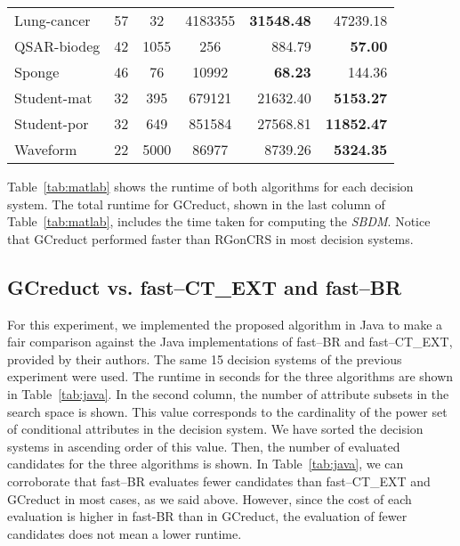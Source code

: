 \documentclass[letterpaper, twoside, openright, 12pt]{book}%
\begin{document}
\begin{table}[H]
\begin{tabular}{lcccrr}
			Lung-cancer               & 57         & 32        & 4183355  & \textbf{31548.48} & 47239.18           \\
			QSAR-biodeg               & 42         & 1055      & 256      &  884.79           & \textbf{57.00}     \\
			Sponge                    & 46         & 76        & 10992    & \textbf{68.23}    & 144.36             \\
			Student-mat               & 32         & 395       & 679121   & 21632.40          & \textbf{5153.27}   \\
			Student-por               & 32         & 649       & 851584   & 27568.81          & \textbf{11852.47}  \\
			Waveform                  & 22         & 5000      & 86977    & 8739.26           & \textbf{5324.35}   \\				
			\hline
    	\end{tabular}
	 \end{table}
	    
	 Table~\ref{tab:matlab} shows the runtime of both algorithms for each decision system. The total runtime for GCreduct, shown in the last column of Table~\ref{tab:matlab}, includes the time taken for computing the \textit{SBDM}. Notice that GCreduct performed faster than RGonCRS in most decision systems.

%	    	
\subsection{GCreduct vs. fast--CT\_EXT and fast--BR}\label{sub:java}
%	 	
	For this experiment, we implemented the proposed algorithm in Java to make a fair comparison against the Java implementations of fast--BR and fast--CT\_EXT, provided by their authors. The same 15 decision systems of the previous experiment were used. The runtime in seconds for the three algorithms are shown in Table~\ref{tab:java}. In the second column, the number of attribute subsets in the search space is shown. This value corresponds to the cardinality of the power set of conditional attributes in the decision system. We have sorted the decision systems in ascending order of this value. Then, the number of evaluated candidates for the three algorithms is shown. In Table~\ref{tab:java}, we can corroborate that fast--BR evaluates fewer candidates than fast--CT\_EXT and GCreduct in most cases, as we said above. However, since the cost of each evaluation is higher in fast-BR than in GCreduct, the evaluation of fewer candidates does not mean a lower runtime. 
	 	
\end{document}
